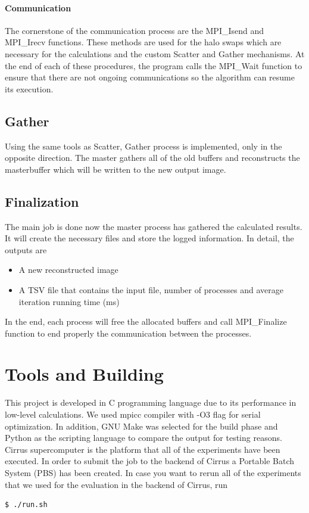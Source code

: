\documentclass[12pt,a4paper]{article}
\newcommand{\sectionVspacing}{\vspace{15pt}}
\begin{document}
        \paragraph{Communication}
            The cornerstone of the communication process are the MPI\_Isend and MPI\_Irecv functions. These methods are used for the halo swaps which are necessary for the calculations and the custom Scatter and Gather mechanisms. At the end of each of these procedures, the program calls the MPI\_Wait function to ensure that there are not ongoing communications so the algorithm can resume its execution.

    \subsection{Gather}
    	Using the same tools as Scatter, Gather process is implemented, only in the opposite direction. The master gathers all of the old buffers and reconstructs the masterbuffer which will be written to the new output image.

    \subsection{Finalization}
    	The main job is done now the master process has gathered the calculated results. It will create the necessary files and store the logged information. In detail, the outputs are

      \begin{itemize}
		    \item A new reconstructed image
		    \item A TSV file that contains the input file, number of processes and average iteration running time (ms)
		  \end{itemize}

    	In the end, each process will free the allocated buffers and call MPI\_Finalize function to end properly the communication between the processes.

\sectionVspacing
\clearpage

\section{Tools and Building}
	This project is developed in C programming language due to its performance in low-level calculations. We used mpicc compiler with -O3 flag for serial optimization. In addition, GNU Make was selected for the build phase and Python as the scripting language to compare the output for testing reasons. Cirrus supercomputer is the platform that all of the experiments have been executed. In order to submit the job to the backend of Cirrus a Portable Batch System (PBS) has been created. In case you want to rerun all of the experiments that we used for the evaluation in the backend of Cirrus, run
  	\begin{lstlisting}[language=bash]
		$ ./run.sh
	\end{lstlisting}
	
\end{document}
